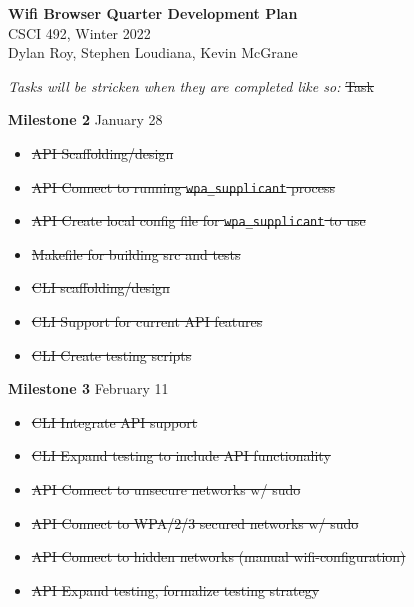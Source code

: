 \documentclass[11pt]{article}
\begin{document}
\begin{center}
  \textbf{\Large Wifi Browser Quarter Development Plan}\\\large CSCI 492, Winter 2022\\
  Dylan Roy, Stephen Loudiana, Kevin McGrane
\end{center}


\textit{Tasks will be stricken when they are completed like so:} \sout{Task}

\textbf{Milestone 2} January 28
\begin{itemize}
  \item\sout{API Scaffolding/design}
  \item\sout{API Connect to running \texttt{wpa\_supplicant} process}
  \item\sout{API Create local config file for \texttt{wpa\_supplicant} to use}
  \item\sout{Makefile for building src and tests}
  \item\sout{CLI scaffolding/design}
  \item\sout{CLI Support for current API features}
  \item\sout{CLI Create testing scripts}
\end{itemize}

\textbf{Milestone 3} February 11
\begin{itemize}
  \item\sout{CLI Integrate API support}
  \item\sout{CLI Expand testing to include API functionality}
  \item\sout{API Connect to unsecure networks w/ sudo}
  \item\sout{API Connect to WPA/2/3 secured networks w/ sudo}
  \item\sout{API Connect to hidden networks (manual wifi-configuration)}
  \item\sout{API Expand testing, formalize testing strategy}
\end{itemize}
\end{document}
